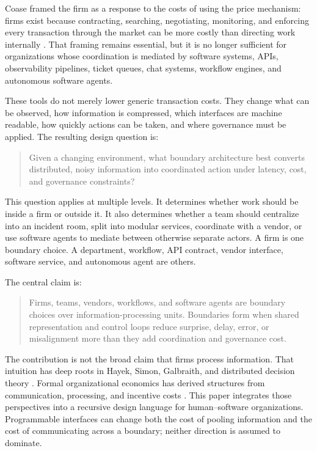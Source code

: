 \documentclass[11pt]{article}
\begin{document}
Coase framed the firm as a response to the costs of using the price mechanism:
firms exist because contracting, searching, negotiating, monitoring, and
enforcing every transaction through the market can be more costly than directing
work internally \cite{coase1937}. That framing remains essential, but it is no
longer sufficient for organizations whose coordination is mediated by software
systems, APIs, observability pipelines, ticket queues, chat systems, workflow
engines, and autonomous software agents.

These tools do not merely lower generic transaction costs. They change what can
be observed, how information is compressed, which interfaces are machine
readable, how quickly actions can be taken, and where governance must be
applied. The resulting design question is:

\begin{quote}
Given a changing environment, what boundary architecture best converts
distributed, noisy information into coordinated action under latency, cost, and
governance constraints?
\end{quote}

This question applies at multiple levels. It determines whether work should be
inside a firm or outside it. It also determines whether a team should centralize
into an incident room, split into modular services, coordinate with a vendor,
or use software agents to mediate between otherwise separate actors. A firm is
one boundary choice. A department, workflow, API contract, vendor interface,
software service, and autonomous agent are others.

The central claim is:

\begin{quote}
Firms, teams, vendors, workflows, and software agents are boundary choices over
information-processing units. Boundaries form when shared representation and
control loops reduce surprise, delay, error, or misalignment more than they add
coordination and governance cost.
\end{quote}


The contribution is not the broad claim that firms process information. That
intuition has deep roots in Hayek, Simon, Galbraith, and distributed decision
theory \cite{hayek1945,simon1947,galbraith1973,marschakradner1972}.
Formal organizational economics has derived structures from communication,
processing, and incentive costs
\cite{radner1993,boltondewatripont1994,garicano2000,alonso2008}.
This paper integrates those perspectives into a recursive design language for
human--software organizations. Programmable interfaces can change both the
cost of pooling information and the cost of communicating across a boundary;
neither direction is assumed to dominate.
\end{document}

